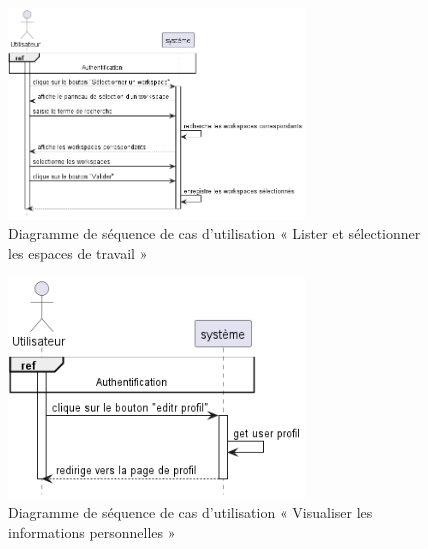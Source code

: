 \begin{figure}[H]
  \centering
  \includegraphics[width=0.7\textwidth]{out/diagrams/sprint6/lister_selectionner_workspaces/lister_selectionner_workspaces}
  \caption{Diagramme de séquence de cas d'utilisation « Lister et sélectionner les espaces de travail »}
  \label{fig:sequence_lister_selectionner_workspaces}
\end{figure}

\begin{figure}[H]
  \centering
  \includegraphics[width=0.7\textwidth]{out/diagrams/sprint6/visualiser_profil/visualiser_profil}
  \caption{Diagramme de séquence de cas d'utilisation « Visualiser les informations personnelles »}
  \label{fig:sequence_visualiser_profil}
\end{figure}

